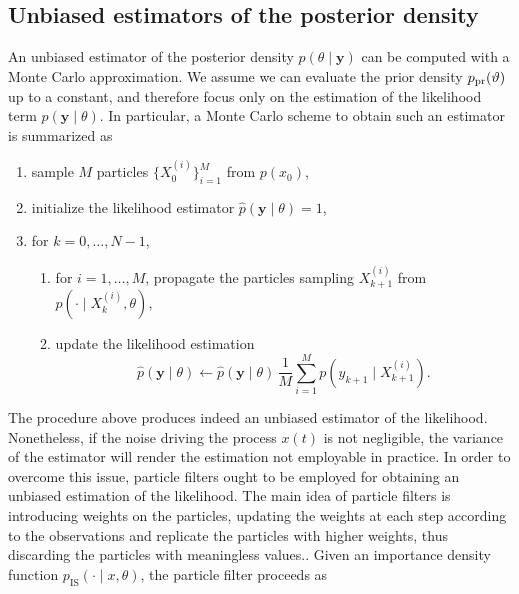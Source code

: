 \documentclass[10pt]{article}
\begin{document}
\subsection{Unbiased estimators of the posterior density}

An unbiased estimator of the posterior density $p(\theta \mid \mathbf y)$ can be computed with a Monte Carlo approximation. We assume we can evaluate the prior density $p_{\mathrm{pr}}(\vartheta)$ up to a constant, and therefore focus only on the estimation of the likelihood term $p(\mathbf y \mid \theta)$. In particular, a Monte Carlo scheme to obtain such an estimator is summarized as
\begin{enumerate}[label=\arabic*)]
	\item sample $M$ particles $\{X^{(i)}_0\}_{i=1}^M$ from $p(x_0)$,
	\item initialize the likelihood estimator $\hat p(\mathbf y \mid \theta) = 1$,
	\item\label{it:extForMC} for $k = 0, \ldots, N-1$,
		\begin{enumerate}[label=\ref{it:extForMC}.\arabic*)]
			\item for $i = 1, \ldots, M$, propagate the particles sampling $X^{(i)}_{k+1}$ from $p(\cdot \mid X_k^{(i)}, \theta)$,
			\item update the likelihood estimation 
			\begin{equation}
				\hat p(\mathbf y \mid \theta) \leftarrow \hat p(\mathbf y \mid \theta) \, \frac{1}{M} \sum_{i=1}^M p(y_{k+1} \mid X_{k+1}^{(i)}).
			\end{equation} 
		\end{enumerate}
\end{enumerate} 
The procedure above produces indeed an unbiased estimator of the likelihood. Nonetheless, if the noise driving the process $x(t)$ is not negligible, the variance of the estimator will render the estimation not employable in practice. In order to overcome this issue, particle filters ought to be employed for obtaining an unbiased estimation of the likelihood. The main idea of particle filters is introducing weights on the particles, updating the weights at each step according to the observations and replicate the particles with higher weights, thus discarding the particles with meaningless values.. Given an importance density function $p_{\mathrm{IS}}(\cdot \mid x, \theta)$, the particle filter proceeds as
\end{document}
